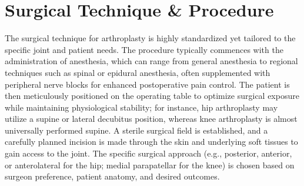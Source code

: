 \section*{Surgical Technique \& Procedure}
The surgical technique for arthroplasty is highly standardized yet tailored to the specific joint and patient needs. The procedure typically commences with the administration of anesthesia, which can range from general anesthesia to regional techniques such as spinal or epidural anesthesia, often supplemented with peripheral nerve blocks for enhanced postoperative pain control. The patient is then meticulously positioned on the operating table to optimize surgical exposure while maintaining physiological stability; for instance, hip arthroplasty may utilize a supine or lateral decubitus position, whereas knee arthroplasty is almost universally performed supine. A sterile surgical field is established, and a carefully planned incision is made through the skin and underlying soft tissues to gain access to the joint. The specific surgical approach (e.g., posterior, anterior, or anterolateral for the hip; medial parapatellar for the knee) is chosen based on surgeon preference, patient anatomy, and desired outcomes.

